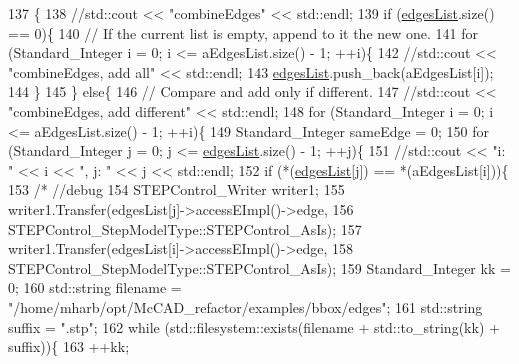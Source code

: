 \begin{DoxyCode}
137                                                                                      \{
138     \textcolor{comment}{//std::cout << "combineEdges" << std::endl;}
139     \textcolor{keywordflow}{if} (\hyperlink{classMcCAD_1_1Geometry_1_1BoundSurface_1_1Impl_a92e901c25606e27f9d11e0837c096f59}{edgesList}.size() == 0)\{
140         \textcolor{comment}{// If the current list is empty, append to it the new one.}
141         \textcolor{keywordflow}{for} (Standard\_Integer i = 0; i <= aEdgesList.size() - 1; ++i)\{
142             \textcolor{comment}{//std::cout << "combineEdges, add all" << std::endl;}
143             \hyperlink{classMcCAD_1_1Geometry_1_1BoundSurface_1_1Impl_a92e901c25606e27f9d11e0837c096f59}{edgesList}.push\_back(aEdgesList[i]);
144         \}
145     \} \textcolor{keywordflow}{else}\{
146         \textcolor{comment}{// Compare and add only if different.}
147         \textcolor{comment}{//std::cout << "combineEdges, add different" << std::endl;}
148         \textcolor{keywordflow}{for} (Standard\_Integer i = 0; i <= aEdgesList.size() - 1; ++i)\{
149             Standard\_Integer sameEdge = 0;
150             \textcolor{keywordflow}{for} (Standard\_Integer j = 0; j <= \hyperlink{classMcCAD_1_1Geometry_1_1BoundSurface_1_1Impl_a92e901c25606e27f9d11e0837c096f59}{edgesList}.size() - 1; ++j)\{
151                 \textcolor{comment}{//std::cout << "i: " << i << ", j: " << j << std::endl;}
152                 \textcolor{keywordflow}{if} (*(\hyperlink{classMcCAD_1_1Geometry_1_1BoundSurface_1_1Impl_a92e901c25606e27f9d11e0837c096f59}{edgesList}[j]) == *(aEdgesList[i]))\{
153                     \textcolor{comment}{/* //debug}
154 \textcolor{comment}{                    STEPControl\_Writer writer1;}
155 \textcolor{comment}{                    writer1.Transfer(edgesList[j]->accessEImpl()->edge,}
156 \textcolor{comment}{                                     STEPControl\_StepModelType::STEPControl\_AsIs);}
157 \textcolor{comment}{                    writer1.Transfer(edgesList[i]->accessEImpl()->edge,}
158 \textcolor{comment}{                                     STEPControl\_StepModelType::STEPControl\_AsIs);}
159 \textcolor{comment}{                    Standard\_Integer kk = 0;}
160 \textcolor{comment}{                    std::string filename = "/home/mharb/opt/McCAD\_refactor/examples/bbox/edges";}
161 \textcolor{comment}{                    std::string suffix = ".stp";}
162 \textcolor{comment}{                    while (std::filesystem::exists(filename + std::to\_string(kk) + suffix))\{}
163 \textcolor{comment}{                        ++kk;}

\end{DoxyCode}
